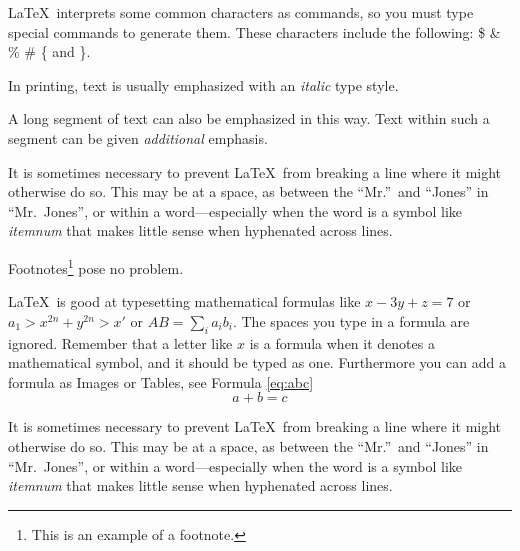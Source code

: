 	\LaTeX\ interprets some common characters as
	commands, so you must type special commands to
	generate them.  These characters include the
	following:
	\$ \& \% \# \{ and \}.
	
	In printing, text is usually emphasized with an
	\emph{italic}  
	type style.  
	
	\begin{em}
		A long segment of text can also be emphasized 
		in this way.  Text within such a segment can be 
		given \emph{additional} emphasis.
	\end{em}
	
	It is sometimes necessary to prevent \LaTeX\ from
	breaking a line where it might otherwise do so.
	This may be at a space, as between the ``Mr.''\ and
	``Jones'' in
	``Mr.~Jones'',        %
	or within a word---especially when the word is a
	symbol like
	\mbox{\emph{itemnum}} 
	that makes little sense when hyphenated across
	lines.
	
	Footnotes\footnote{This is an example of a footnote.}
	pose no problem.
	
	\LaTeX\ is good at typesetting mathematical formulas
	like
	\( x-3y + z = 7 \) 
	or
	\( a_{1} > x^{2n} + y^{2n} > x' \)
	or  
	\( AB  = \sum_{i} a_{i} b_{i} \).
	The spaces you type in a formula are 
	ignored.  Remember that a letter like
	$x$                   %
	is a formula when it denotes a mathematical
	symbol, and it should be typed as one.
	Furthermore you can add a formula as Images or Tables, see Formula  \hyperref[eq:abc]{\ref{eq:abc}}
	\begin{equation}
	\label{eq:abc}
	a+b=c
	\end{equation}
	
		It is sometimes necessary to prevent \LaTeX\ from
	breaking a line where it might otherwise do so.
	This may be at a space, as between the ``Mr.''\ and
	``Jones'' in
	``Mr.~Jones'',        %
	or within a word---especially when the word is a
	symbol like
	\mbox{\emph{itemnum}} 
	that makes little sense when hyphenated across
	lines.